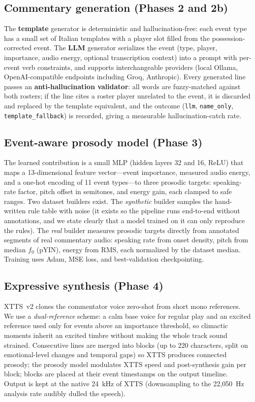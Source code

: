 \documentclass[10pt,twocolumn,a4paper]{article}
\begin{document}
	\subsection{Commentary generation (Phases 2 and 2b)}

	The \textbf{template} generator is deterministic and hallucination-free: each event type has a small set of Italian templates with a player slot filled from the possession-corrected event. The \textbf{LLM} generator serializes the event (type, player, importance, audio energy, optional transcription context) into a prompt with per-event verb constraints, and supports interchangeable providers (local Ollama, OpenAI-compatible endpoints including Groq, Anthropic). Every generated line passes an \textbf{anti-hallucination validator}: all words are fuzzy-matched against both rosters; if the line cites a roster player unrelated to the event, it is discarded and replaced by the template equivalent, and the outcome (\texttt{llm}, \texttt{name\_only}, \texttt{template\_fallback}) is recorded, giving a measurable hallucination-catch rate.

	\subsection{Event-aware prosody model (Phase 3)}

	The learned contribution is a small MLP (hidden layers 32 and 16, ReLU) that maps a 13-dimensional feature vector---event importance, measured audio energy, and a one-hot encoding of 11 event types---to three prosodic targets: speaking-rate factor, pitch offset in semitones, and energy gain, each clamped to safe ranges. Two dataset builders exist. The \emph{synthetic} builder samples the hand-written rule table with noise (it exists so the pipeline runs end-to-end without annotations, and we state clearly that a model trained on it can only reproduce the rules). The \emph{real} builder measures prosodic targets directly from annotated segments of real commentary audio: speaking rate from onset density, pitch from median $f_0$ (pYIN), energy from RMS, each normalized by the dataset median. Training uses Adam, MSE loss, and best-validation checkpointing.

	\subsection{Expressive synthesis (Phase 4)}

	XTTS~v2 clones the commentator voice zero-shot from short mono references. We use a \emph{dual-reference} scheme: a calm base voice for regular play and an excited reference used only for events above an importance threshold, so climactic moments inherit an excited timbre without making the whole track sound strained. Consecutive lines are merged into blocks (up to 220 characters, split on emotional-level changes and temporal gaps) so XTTS produces connected prosody; the prosody model modulates XTTS speed and post-synthesis gain per block; blocks are placed at their event timestamps on the output timeline. Output is kept at the native 24~kHz of XTTS (downsampling to the 22{,}050~Hz analysis rate audibly dulled the speech).
\end{document}
